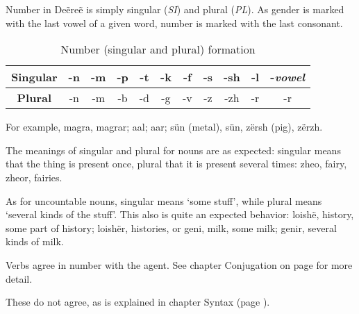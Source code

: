 Number in Deẽreẽ is simply singular (\emph{SI}) and plural (\emph{PL}). As gender is marked with the
last vowel of a given word, number is marked with the last consonant.

\begin{table}[h]\label{tab:morph-number}
\begin{center}
\begin{tabular}{|c|cccccccccc|}
\hline
\textbf{Singular} & -n & -m & -p & -t & -k & -f & -s & -sh & -l & -\emph{vowel}\\\hline
\textbf{Plural}   & -n & -m & -b & -d & -g & -v & -z & -zh & -r & -r\\\hline
\end{tabular}
\end{center}
\caption{Number (singular and plural) formation}
\end{table}

For example, magra, magrar; aal; aar; \gls{sün} (metal), sün, 
\gls{zërsh} (pig), zërzh.

The meanings of singular and plural for nouns are as expected: singular means that the thing is
present once, plural that it is present several times: \gls{zheo}, fairy,
\gls{zheo}r, fairies.

As for uncountable nouns, singular means ‘some stuff’, while plural means ‘several kinds of the
stuff’. This also is quite an expected behavior: \gls{loishë}, history,
some part of history; \gls{loishë}r, histories, or \gls{geni}, milk, some milk;
\gls{geni}r, several kinds of milk.

Verbs agree in number with the agent. See chapter Conjugation on page \pageref{chap:conjugation} for
more detail.

These do not agree, as is explained in chapter Syntax (page \pageref{chap:syntax}).

